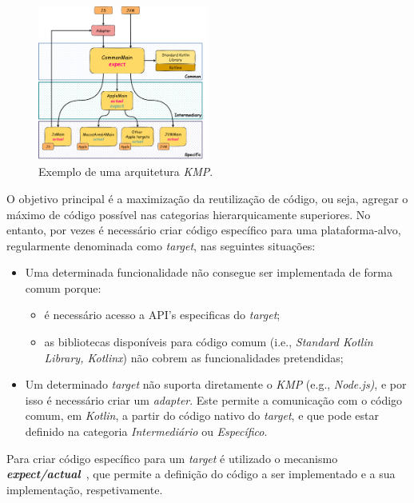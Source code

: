 \begin{figure}[H]
    \centering
    \includegraphics[width=0.5\textwidth]{../../docs/imgs/kmp-architecture}
    \caption{Exemplo de uma arquitetura \textit{KMP}.}
    \label{fig:kmp-architecture}
\end{figure}

O objetivo principal é a maximização da reutilização de código, ou seja, agregar o máximo de código possível nas categorias hierarquicamente superiores. No entanto, por vezes é necessário criar código específico para uma plataforma-alvo, regularmente denominada como \textit{target}, nas seguintes situações:

\begin{itemize}[topsep=0pt,itemsep=0pt,partopsep=0pt, parsep=0pt]
    \item Uma determinada funcionalidade não consegue ser implementada de forma comum porque:
    \begin{itemize}[topsep=0pt,itemsep=0pt,partopsep=0pt, parsep=0pt]
        \item é necessário acesso a API's especificas do \textit{target};
        \item as bibliotecas disponíveis para código comum (i.e., \textit{Standard Kotlin Library, Kotlinx}) não cobrem as funcionalidades pretendidas;
    \end{itemize}
    \item Um determinado \textit{target} não suporta diretamente o \textit{KMP} (e.g., \textit{Node.js)}, e por isso é necessário criar um \textit{adapter}.
    Este permite a comunicação com o código comum, em \textit{Kotlin}, a partir do código nativo do \textit{target}, e que pode estar definido na categoria \textit{Intermediário} ou \textit{Específico}.
\end{itemize}

Para criar código específico para um \textit{target} é utilizado o
mecanismo \textbf{\textit{expect/actual}}~\cite{kmp-expect-actual}, que permite a definição do código a ser implementado e a sua implementação, respetivamente.

